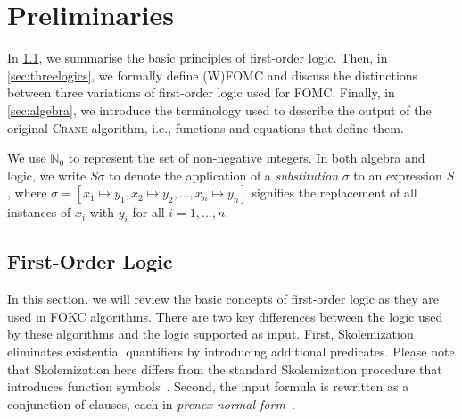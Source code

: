 \documentclass[a4paper,UKenglish,cleveref, autoref, thm-restate]{lipics-v2021}
\begin{document}
\section{Preliminaries}\label{sec:preliminaries}



In \cref{sec:logic}, we summarise the basic principles of first-order logic.
Then, in \cref{sec:threelogics}, we formally define (W)FOMC and discuss the
distinctions between three variations of first-order logic used for FOMC.\@
Finally, in \cref{sec:algebra}, we introduce the terminology used to describe
the output of the original \textsc{Crane} algorithm, i.e., functions and
equations that define them.

We use $\mathbb{N}_{0}$ to represent the set of non-negative integers. In both
algebra and logic, we write $S\sigma$ to denote the application of a
\emph{substitution} $\sigma$ to an expression $S$, where
$\sigma = [x_{1} \mapsto y_{1}, x_{2} \mapsto y_{2}, \dots, x_{n} \mapsto y_{n}]$
signifies the replacement of all instances of $x_{i}$ with $y_{i}$ for all
$i = 1, \dots, n$.

\subsection{First-Order Logic}\label{sec:logic}

In this section, we will review the basic concepts of first-order logic as they
are used in FOKC algorithms. There are two key differences between the logic
used by these algorithms and the logic supported as input. First,
Skolemization~\cite{DBLP:conf/kr/BroeckMD14} eliminates existential quantifiers
by introducing additional predicates. Please note that Skolemization here
differs from the standard Skolemization procedure that introduces function
symbols~\cite{DBLP:books/daglib/0030198}. Second, the input formula is rewritten
as a conjunction of clauses, each in \emph{prenex normal
  form}~\cite{hinman2018fundamentals}.
\end{document}
